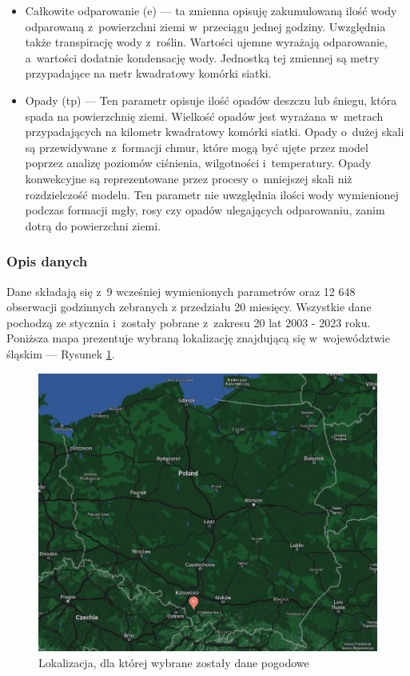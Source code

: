 \begin{itemize}
    \item Całkowite odparowanie (e) — ta zmienna opisuję zakumulowaną ilość wody odparowaną z~powierzchni
    ziemi w~przeciągu jednej godziny. Uwzględnia także transpirację wody z~roślin. Wartości ujemne
    wyrażają odparowanie, a~wartości dodatnie kondensację wody. Jednostką tej zmiennej są metry
    przypadające na metr kwadratowy komórki siatki.

    \item Opady (tp) — Ten parametr opisuje ilość opadów deszczu lub śniegu, która spada na powierzchnię ziemi.
    Wielkość opadów jest wyrażana w~metrach przypadających na kilometr kwadratowy komórki siatki.
    Opady o~dużej skali są przewidywane z~formacji chmur, które mogą być ujęte przez model poprzez 
    analizę poziomów ciśnienia, wilgotności i~temperatury. 
    Opady konwekcyjne są reprezentowane przez procesy
    o~mniejszej skali niż rozdzielczość modelu. Ten parametr nie uwzględnia ilości wody wymienionej
    podczas formacji mgły, rosy czy opadów ulegających odparowaniu, zanim dotrą do powierzchni ziemi.

\end{itemize}

\pagebreak

\subsubsection*{Opis danych}

Dane składają się z~9 wcześniej wymienionych parametrów oraz 12 648 obserwacji godzinnych zebranych
z przedziału 20 miesięcy. Wszystkie dane pochodzą ze stycznia i~zostały pobrane z~zakresu 20 lat
2003 - 2023 roku. Poniższa mapa prezentuje wybraną lokalizację znajdującą się w~województwie śląskim — Rysunek \ref{map}.

\begin{figure}[H]
    \centering
    \includegraphics[width=\textwidth]{images/map.png}
    \caption[Wybrana lokalizacja]{Lokalizacja, dla której wybrane zostały dane pogodowe}
    \label{map}
\end{figure}

